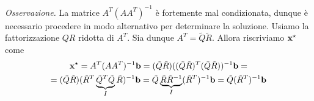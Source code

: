 \textit{Osservazione.} La matrice $A^T(AA^T)^{-1}$ è fortemente mal condizionata, dunque è necessario procedere in modo alternativo per determinare la soluzione. Usiamo la fattorizzazione $QR$ ridotta di $A^T$. Sia dunque $A^T=\tilde Q\tilde R$. Allora riscriviamo $\mathbf{x}^\star$ come
\begin{multline*}
    \mathbf{x}^\star = A^T(AA^T)^{-1}\mathbf b = (\tilde Q \tilde R)(( \tilde Q \tilde R)^T( \tilde Q \tilde R))^{-1}\mathbf b=\\=
    (\tilde Q \tilde R)(\tilde R^T \underbrace{\tilde Q^T \tilde Q}_I \tilde R)^{-1}\mathbf b = 
    \tilde Q \underbrace{\tilde R  \tilde R^{-1}}_I(\tilde R^T)^{-1} \mathbf b = 
    \tilde Q (\tilde R^T)^{-1} \mathbf b
\end{multline*}
